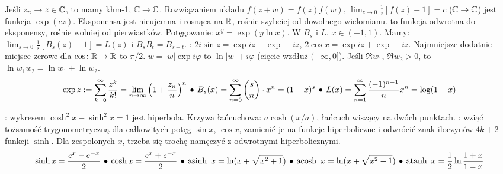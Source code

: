 Jeśli  $z_n \to z \in \mathbb{C}$, to \prawo{\ldots} mamy  khm-1,  $\mathbb{C} \to \mathbb{C}$.
Rozwiązaniem układu $f(z + w) = f(z) f(w)$, $\lim_{z \to 0} \frac 1z [f(z) - 1] = c$ ($\mathbb{C} \to \mathbb{C}$) jest funkcja $\exp (cz)$.
Eksponensa jest nieujemna i rosnąca na $\mathbb{R}$, rośnie szybciej od dowolnego wielomianu.
 to funkcja odwrotna do eksponensy, rośnie wolniej od pierwiastków.
Potęgowanie: $x^y = \exp (y \ln x)$.
W $B_s$ i $L$, $x \in (-1, 1)$.
Mamy: $\lim_{s \to 0} \frac 1s [B_s(z) - 1] = L(z)$ i $B_s B_t = B_{s+t}$.
: $2i \sin z = \exp iz - \exp -iz$, $2 \cos x = \exp iz + \exp - iz$.
Najmniejsze dodatnie miejsce zerowe dla $\cos \colon \mathbb{R} \to \mathbb{R}$ to $\pi / 2$.
 $w = |w| \exp i \varphi$ to $\ln |w| + i \varphi$ (cięcie wzdłuż $(-\infty, 0]$).
Jeśli $\Re w_1$, $\Re w_2 > 0$, to $\ln w_1 w_2 = \ln w_1 + \ln w_2$.
\[
	\exp z := \sum_{k=0}^\infty \frac {z^k}{k!} = \lim_{n \to \infty} \left(1 + \frac{z_n}n \right)^n \, \bullet \,
	B_s(x) = \sum_{n=0}^\infty {s \choose n} \cdot x^n = (1+x)^s \, \bullet \,
	L(x) = \sum_{n=1}^\infty \frac{(-1)^{n-1}}{n} x^n = \log ( 1 +x)
\]

:  wykresem $\cosh^2 x - \sinh^2 x = 1$ jest hiperbola.
Krzywa łańcuchowa: $a \cosh (x/a)$, łańcuch wiszący na dwóch punktach.
: wziąć tożsamość trygonometryczną dla całkowitych potęg $\sin x$, $\cos x$, zamienić je na funkcje hiperboliczne i odwrócić znak iloczynów $4k+2$ funkcji $\sinh$.
Dla zespolonych $x$, trzeba się trochę namęczyć z odwrotnymi hiperbolicznymi.
\[
	\sinh x = \frac{e^x - e^{-x}}{2} \, \bullet \,
	\cosh x = \frac{e^x + e^{-x}}{2} \, \bullet \,
	\operatorname{asinh}\ x = \ln(x + \sqrt{x^2 + 1}) \, \bullet \,
	\operatorname{acosh}\ x = \ln(x + \sqrt{x^2 - 1}) \, \bullet \,
    \operatorname{atanh}\ x = \frac{1}{2} \ln\frac{1+x}{1-x}
\]

